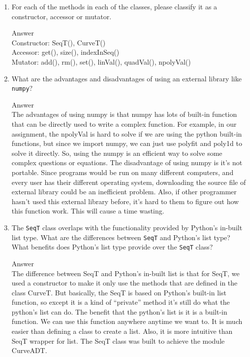 \documentclass[12pt]{article}
\begin{document}
\begin{enumerate}

\item For each of the methods in each of the classes, please classify it as a
  constructor, accessor or mutator.

Answer
\\Constructor: SeqT(), CurveT()
\\Accessor: get(), size(), indexInSeq()
\\Mutator: add(), rm(), set(), linVal(), quadVal(), npolyVal()


\item What are the advantages and disadvantages of using an external library
  like \texttt{numpy}?

Answer
\\The advantages of using numpy is that numpy has lots of built-in function that can be directly used to write a complex function. For example, in our assignment, the npolyVal is hard to solve if we are using the python built-in functions, but since we import numpy, we can just use polyfit and poly1d to solve it directly. So, using the numpy is an efficient way to solve some complex questions or equations.
The disadvantage of using numpy is it’s not portable. Since programs would be run on many different computers, and every user has their different operating system, downloading the source file of external library could be an inefficient problem. Also, if other programmer hasn’t used this external library before, it’s hard to them to figure out how this function work. This will cause a time wasting.

\item The \texttt{SeqT} class overlaps with the functionality provided by
  Python's in-built list type.  What are the differences between \texttt{SeqT}
  and Python's list type?  What benefits does Python's list type provide over
  the \texttt{SeqT} class?

Answer
\\The difference between SeqT and Python’s in-built list is that for SeqT, we used a constructor to make it only use the methods that are defined in the class CurveT. But basically, the SeqT is based on Python’s built-in list function, so except it is a kind of “private” method it’s still do what the python’s list can do. The benefit that the python’s list is it is a built-in function. We can use this function anywhere anytime we want to. It is much easier than defining a class to create a list. Also, it is more intuitive than SeqT wrapper for list. The SeqT class was built to achieve the module CurveADT.


\end{enumerate}
\end{document}
